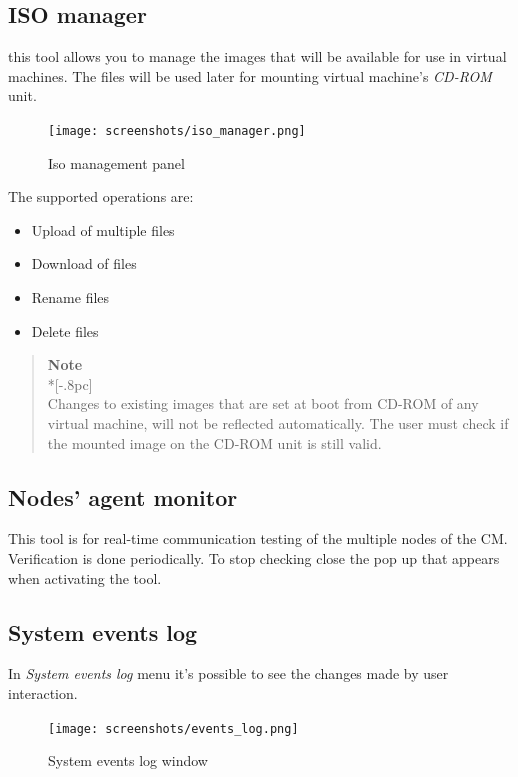 \subsection{ISO manager}
\label{sec:iso_manager}
this tool allows you to manage the images that will be available for use in virtual machines.
The files will be used later for mounting virtual machine's \emph{CD-ROM} unit.

\begin{figure}[H]
	\begin{center}
	\texttt{[image: screenshots/iso\_manager.png]}
	\caption{Iso management panel}
	\label{fig:iso_manager}
	\end{center}
\end{figure}

The supported operations are:
\begin{itemize}
\item Upload of multiple files
\item Download of files
\item Rename files
\item Delete files
\end{itemize}


\begin{quote}
	{\large \bf Note} \\*[-.8pc]
	\underline{\hspace{6in}} \\
    Changes to existing images that are set at boot from CD-ROM of any virtual machine, will not be reflected automatically. The user must check if the mounted image on the CD-ROM unit is still valid.
\end{quote}

\subsection{Nodes' agent monitor}
This tool is for real-time communication testing of the multiple nodes of the CM. Verification is done periodically.
To stop checking close the pop up that appears when activating the tool.

\subsection{System events log}
\label{sec:system_event_reg}

In \emph{System events log} menu it's possible to see the changes made by user interaction.

\begin{figure}[H]
	\begin{center}
	\texttt{[image: screenshots/events\_log.png]}
	\caption{System events log window}
	\label{fig:events_log}
	\end{center}
\end{figure}

